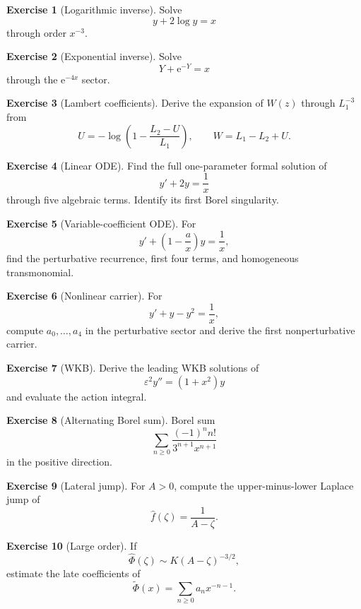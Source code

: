 \documentclass[11pt,oneside,openany]{book}
\newcommand{\e}{\mathrm{e}}
\newcommand{\eps}{\varepsilon}
\theoremstyle{plain}
\theoremstyle{definition}
\newtheorem{exercise}{Exercise}[chapter]
\theoremstyle{remark}
\begin{document}
\begin{exercise}[Logarithmic inverse]
Solve
\[
  y+2\log y=x
\]
through order $x^{-3}$.
\end{exercise}

\begin{exercise}[Exponential inverse]
Solve
\[
  Y+\e^{-Y}=x
\]
through the $\e^{-4x}$ sector.
\end{exercise}

\begin{exercise}[Lambert coefficients]
Derive the expansion of $W(z)$ through $L_1^{-3}$ from
\[
  U=-\log\left(1-\frac{L_2-U}{L_1}\right),
  \qquad W=L_1-L_2+U.
\]
\end{exercise}

\begin{exercise}[Linear ODE]
Find the full one-parameter formal solution of
\[
  y'+2y=\frac1x
\]
through five algebraic terms. Identify its first Borel singularity.
\end{exercise}

\begin{exercise}[Variable-coefficient ODE]
For
\[
  y'+\left(1-\frac ax\right)y=\frac1x,
\]
find the perturbative recurrence, first four terms, and homogeneous transmonomial.
\end{exercise}

\begin{exercise}[Nonlinear carrier]
For
\[
  y'+y-y^2=\frac1x,
\]
compute $a_0,\ldots,a_4$ in the perturbative sector and derive the first nonperturbative carrier.
\end{exercise}

\begin{exercise}[WKB]
Derive the leading WKB solutions of
\[
  \eps^2y''=(1+x^2)y
\]
and evaluate the action integral.
\end{exercise}

\begin{exercise}[Alternating Borel sum]
Borel sum
\[
  \sum_{n\ge0}\frac{(-1)^nn!}{3^{n+1}x^{n+1}}
\]
in the positive direction.
\end{exercise}

\begin{exercise}[Lateral jump]
For $A>0$, compute the upper-minus-lower Laplace jump of
\[
  \widehat f(\zeta)=\frac1{A-\zeta}.
\]
\end{exercise}

\begin{exercise}[Large order]
If
\[
  \widehat\Phi(\zeta)\sim K(A-\zeta)^{-3/2},
\]
estimate the late coefficients of
\[
  \widetilde\Phi(x)=\sum_{n\ge0}a_nx^{-n-1}.
\]
\end{exercise}
\end{document}
